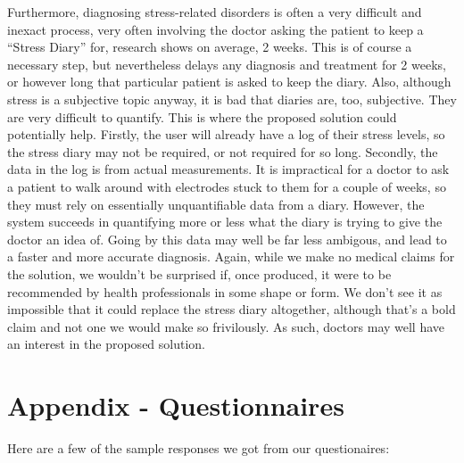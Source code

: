 \documentclass{scrartcl}
\begin{document}
Furthermore, diagnosing stress-related disorders is often a very difficult and inexact process, very often involving the doctor
asking the patient to keep a ``Stress Diary'' for, research shows on average, 2 weeks. This is of course a necessary step, but
nevertheless delays any diagnosis and treatment for 2 weeks, or however long that particular patient is asked to keep the diary.
Also, although stress is a subjective topic anyway, it is bad that diaries are, too, subjective. They are very difficult to
quantify. This is where the proposed solution could potentially help. Firstly, the user will already have a log of their stress
levels, so the stress diary may not be required, or not required for so long. Secondly, the data in the log is from actual
measurements. It is impractical for a doctor to ask a patient to walk around with electrodes stuck to them for a couple of weeks,
so they must rely on essentially unquantifiable data from a diary. However, the system succeeds in quantifying more or less what
the diary is trying to give the doctor an idea of. Going by this data may well be far less ambigous, and lead to a faster and
more accurate diagnosis. Again, while we make no medical claims for the solution, we wouldn't be surprised if, once produced,
it were to be recommended by health professionals in some shape or form. We don't see it as impossible that it could replace
the stress diary altogether, although that's a bold claim and not one we would make so frivilously. As such, doctors may
well have an interest in the proposed solution.

\section{Appendix - Questionnaires}
Here are a few of the sample responses we got from our questionaires:






\end{document}
